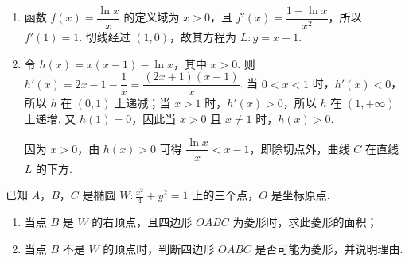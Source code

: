 \begin{solution}
\begin{enumerate}
\item 函数 \(f(x)=\dfrac{\ln x}{x}\) 的定义域为 \(x>0\)，且
\(f'(x)=\dfrac{1-\ln x}{x^2}\)，所以 \(f'(1)=1\). 切线经过 \((1,0)\)，故其方程为 \(L:y=x-1\).

\item 令 \(h(x)=x(x-1)-\ln x\)，其中 \(x>0\). 则
\(h'(x)=2x-1-\dfrac1x=\dfrac{(2x+1)(x-1)}x\). 当 \(0<x<1\) 时，\(h'(x)<0\)，所以 \(h\) 在 \((0,1)\) 上递减；当 \(x>1\) 时，\(h'(x)>0\)，所以 \(h\) 在 \((1,+\infty)\) 上递增. 又 \(h(1)=0\)，因此当 \(x>0\) 且 \(x\ne1\) 时，\(h(x)>0\).

因为 \(x>0\)，由 \(h(x)>0\) 可得 \(\dfrac{\ln x}{x}<x-1\)，即除切点外，曲线 \(C\) 在直线 \(L\) 的下方.
\end{enumerate}
\end{solution}

\begin{problem}
已知 \(A\)，\(B\)，\(C\) 是椭圆 \(W: \frac{x^2}{4} + y^2 = 1\) 上的三个点，\(O\) 是坐标原点.
\begin{enumerate}
\item 当点 \(B\) 是 \(W\) 的右顶点，且四边形 \(OABC\) 为菱形时，求此菱形的面积；
\item 当点 \(B\) 不是 \(W\) 的顶点时，判断四边形 \(OABC\) 是否可能为菱形，并说明理由.
\end{enumerate}
\end{problem}

